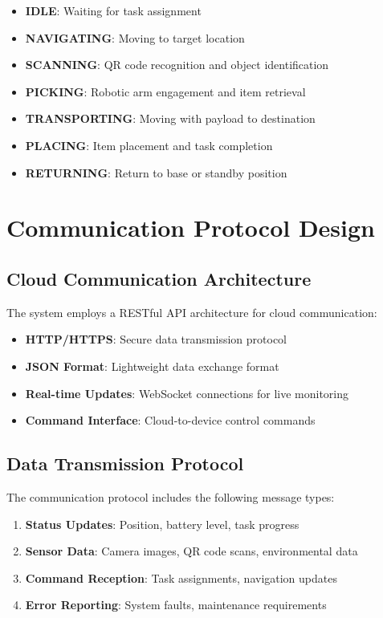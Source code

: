 \begin{itemize}
\item \textbf{IDLE}: Waiting for task assignment
\item \textbf{NAVIGATING}: Moving to target location
\item \textbf{SCANNING}: QR code recognition and object identification
\item \textbf{PICKING}: Robotic arm engagement and item retrieval
\item \textbf{TRANSPORTING}: Moving with payload to destination
\item \textbf{PLACING}: Item placement and task completion
\item \textbf{RETURNING}: Return to base or standby position
\end{itemize}

\section{Communication Protocol Design}

\subsection{Cloud Communication Architecture}
The system employs a RESTful API architecture for cloud communication:

\begin{itemize}
\item \textbf{HTTP/HTTPS}: Secure data transmission protocol
\item \textbf{JSON Format}: Lightweight data exchange format
\item \textbf{Real-time Updates}: WebSocket connections for live monitoring
\item \textbf{Command Interface}: Cloud-to-device control commands
\end{itemize}

\subsection{Data Transmission Protocol}
The communication protocol includes the following message types:

\begin{enumerate}
\item \textbf{Status Updates}: Position, battery level, task progress
\item \textbf{Sensor Data}: Camera images, QR code scans, environmental data
\item \textbf{Command Reception}: Task assignments, navigation updates
\item \textbf{Error Reporting}: System faults, maintenance requirements
\end{enumerate}

